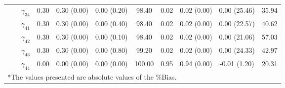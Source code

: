 \begin{table}[h]
{\begin{tabular}{ccccccccccc}
 &  & $\gamma_{34}$ & 0.30 & 0.30 (0.00) & 0.00 (0.20) & 98.40 & 0.02 & 0.02 (0.00) & 0.00 (25.46) & 35.94 \\
 &  & $\gamma_{41}$ & 0.30 & 0.30 (0.00) & 0.00 (0.40) & 98.40 & 0.02 & 0.02 (0.00) & 0.00 (22.57) & 40.62 \\
 &  & $\gamma_{42}$ & 0.30 & 0.30 (0.00) & 0.00 (0.10) & 98.40 & 0.02 & 0.02 (0.00) & 0.00 (21.06) & 57.03 \\
 &  & $\gamma_{43}$ & 0.30 & 0.30 (0.00) & 0.00 (0.80) & 99.20 & 0.02 & 0.02 (0.00) & 0.00 (24.33) & 42.97 \\
 &  & $\gamma_{44}$ & 0.00 & 0.00 (0.00) & 0.00 (0.00) & 100.00 & 0.95 & 0.94 (0.00) & -0.01 (1.20) & 20.31 \\

\bottomrule 
\multicolumn{10}{l}{*The values presented are absolute values of the \%Bias.}
\end{tabular}}
\label{tgr1_3}
\end{table}

